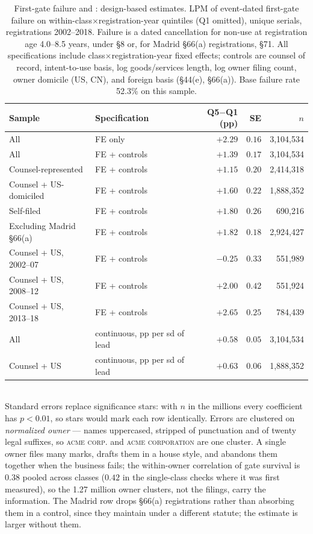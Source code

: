 \begin{table}[h]\centering\small
\caption{First-gate failure and \dkl{}: design-based estimates.
LPM of event-dated first-gate failure on within-class$\times$registration-year
\dkl{} quintiles (Q1 omitted), unique serials, registrations 2002--2018.
Failure is a dated cancellation for non-use at registration age 4.0--8.5
years, under \S8 or, for Madrid \S66(a) registrations, \S71.
All specifications include class$\times$registration-year fixed effects; controls
are counsel of record, intent-to-use basis, log goods/services length,
log owner filing count, owner domicile (US, CN), and foreign basis
(\S44(e), \S66(a)). Base failure rate 52.3\% on this sample.}
\label{tab:gate_lpm}
\begin{tabular}{llrrr}
\toprule
Sample & Specification & Q5$-$Q1 (pp) & SE & $n$ \\
\midrule
All & FE only & $+2.29$ & $0.16$ & 3{,}104{,}534 \\
All & FE + controls & $+1.39$ & $0.17$ & 3{,}104{,}534 \\
Counsel-represented & FE + controls & $+1.15$ & $0.20$ & 2{,}414{,}318 \\
Counsel + US-domiciled & FE + controls & $+1.60$ & $0.22$ & 1{,}888{,}352 \\
Self-filed & FE + controls & $+1.80$ & $0.26$ & 690{,}216 \\
Excluding Madrid \S66(a) & FE + controls & $+1.82$ & $0.18$ & 2{,}924{,}427 \\
\midrule
Counsel + US, 2002--07 & FE + controls & $-0.25$ & $0.33$ & 551{,}989 \\
Counsel + US, 2008--12 & FE + controls & $+2.00$ & $0.42$ & 551{,}924 \\
Counsel + US, 2013--18 & FE + controls & $+2.65$ & $0.25$ & 784{,}439 \\
\midrule
All & continuous, pp per sd of lead & $+0.58$ & $0.05$ & 3{,}104{,}534 \\
Counsel + US & continuous, pp per sd of lead & $+0.63$ & $0.06$ & 1{,}888{,}352 \\
\bottomrule
\end{tabular}
\\[0.3em]\footnotesize Standard errors replace significance stars: with $n$
in the millions every coefficient has $p < 0.01$, so stars would mark each
row identically. Errors are clustered on \emph{normalized owner} --- names
uppercased, stripped of punctuation and of twenty legal suffixes, so
\textsc{acme corp.} and \textsc{acme corporation} are one cluster. A single
owner files many marks, drafts them in a house style, and abandons them
together when the business fails; the within-owner correlation of gate
survival is $0.38$ pooled across classes ($0.42$ in the single-class checks
where it was first measured), so the 1.27 million owner clusters, not the filings,
carry the information. The Madrid row drops \S66(a) registrations rather
than absorbing them in a control, since they maintain under a different
statute; the estimate is larger without them.
\end{table}


